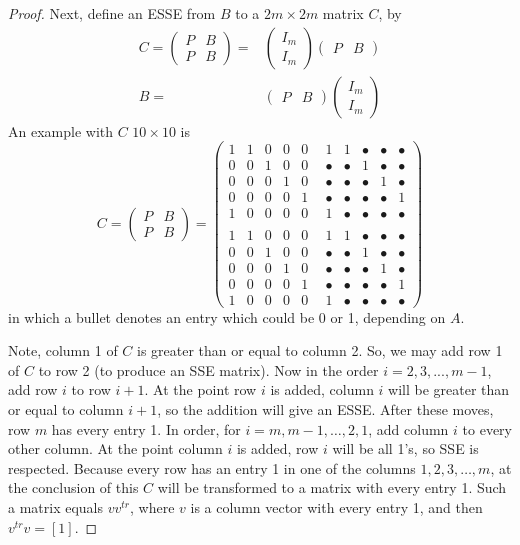 \documentclass{amsart}
\theoremstyle{definition}
\theoremstyle{remark}
\newcommand{\bu}{\bullet}
\numberwithin{equation}{section}
\begin{document}
{{\begin{proof}
Next, 
define an ESSE from $B$ to a $2m\times 2m$ matrix $C$, by 
\begin{align*} 
C = 
\begin{pmatrix} 
P & B \\ 
P & B 
\end{pmatrix} 
= &
\begin{pmatrix} 
I_m \\ I_{m}  
\end{pmatrix} 
\begin{pmatrix} 
P&B
\end{pmatrix} \\ 
B  = &
 \begin{pmatrix} 
P & B 
\end{pmatrix}
\begin{pmatrix} 
I_m \\ I_{m}
\end{pmatrix} 
\end{align*} 
An example  with $C$ $10 \times 10$ is  
\[ \label{tenbyten}
C =
\begin{pmatrix} 
P & B \\ P & B 
\end{pmatrix} 
= 
\begin{pmatrix} 
1 & 1 & 0 & 0 & 0 &   \ \ 
1  & 1 & \bu & \bu & \bu \\ 
0 & 0 & 1 & 0 & 0   &   \ \ 
\bu  & \bu & 1 & \bu & \bu \\ 
0 & 0 & 0 & 1 & 0   &   \ \ 
\bu  & \bu & \bu & 1 & \bu \\ 
0 & 0 & 0 & 0 & 1     &   \ \ 
\bu & \bu & \bu & \bu & 1 \\ 
1 & 0 & 0 & 0 & 0   &   \ \ 
1 & \bu & \bu & \bu & \bu \\ 
                                       \\ 
1 & 1 & 0 & 0 & 0   &   \ \ 
1 & 1 & \bu & \bu & \bu \\ 
0 & 0 & 1 & 0 & 0   &   \ \ 
\bu  & \bu & 1 & \bu & \bu \\ 
0 & 0 & 0 & 1 & 0    &   \ \ 
\bu & \bu & \bu & 1 & \bu \\ 
0 & 0 & 0 & 0 & 1   &   \ \ 
 \bu  & \bu & \bu & \bu & 1 \\ 
1 & 0 & 0 & 0 & 0   &   \ \ 
1  & \bu & \bu & \bu & \bu 
\end{pmatrix}    
\]
in which a bullet denotes an entry which could be 0 or 1, depending on $A$. 

Note, column 1 of $C$ is greater than or equal to column 2. 
So, we may add row 1 of $C$  to row 2 (to produce an SSE matrix). 
Now in the order $i=2,3, ..., m-1$, add row $i$ to row $i+1$. 
At the point row $i$ is added, column $i$ will be greater than or 
equal to column $i+1$, so the addition will 
give an ESSE.  After these moves, row $m$ has every entry 1. 
 In order, for $i=m, m-1, \dots , 2,1$, add column 
$i$ to every other column. At the point column $i$ is added, 
row $i$ will be all 1's, so SSE is respected.  Because every row 
has an entry 1 in one of the columns $1,2,3,\dots , m$, at the conclusion 
of this $C$ will be transformed to a matrix with every entry 1. 
Such a matrix equals $vv^{tr}$, where $v$ is a column vector with every 
entry 1, and then $v^{tr}v=[1]$. 
\end{proof} 

}}
\end{document}

